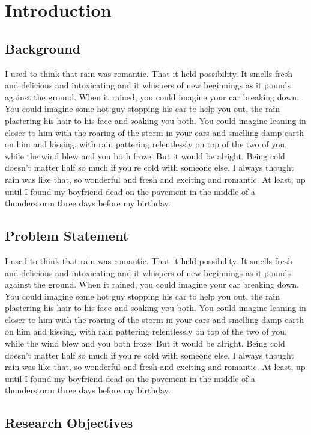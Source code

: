 \chapter{Introduction}

\section{Background}
I used to think that rain was romantic. That it held possibility. It smells fresh and delicious and intoxicating and it whispers of new beginnings as it pounds against the ground. When it rained, you could imagine your car breaking down. You could imagine some hot guy stopping his car to help you out, the rain plastering his hair to his face and soaking you both. You could imagine leaning in closer to him with the roaring of the storm in your ears and smelling damp earth on him and kissing, with rain pattering relentlessly on top of the two of you, while the wind blew and you both froze. But it would be alright. Being cold doesn't matter half so much if you're cold with someone else.
I always thought rain was like that, so wonderful and fresh and exciting and romantic.
At least, up until I found my boyfriend dead on the pavement in the middle of a thunderstorm three days before my birthday.

\section{Problem Statement}

I used to think that rain was romantic. That it held possibility. It smells fresh and delicious and intoxicating and it whispers of new beginnings as it pounds against the ground. When it rained, you could imagine your car breaking down. You could imagine some hot guy stopping his car to help you out, the rain plastering his hair to his face and soaking you both. You could imagine leaning in closer to him with the roaring of the storm in your ears and smelling damp earth on him and kissing, with rain pattering relentlessly on top of the two of you, while the wind blew and you both froze. But it would be alright. Being cold doesn't matter half so much if you're cold with someone else.
I always thought rain was like that, so wonderful and fresh and exciting and romantic.
At least, up until I found my boyfriend dead on the pavement in the middle of a thunderstorm three days before my birthday.

\section{Research Objectives}

